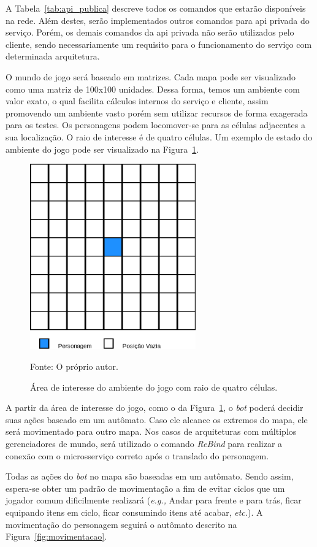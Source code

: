 A Tabela~\ref{tab:api_publica} descreve todos os comandos que estarão disponíveis na rede.
%
Além destes, serão implementados outros comandos para \ac{api} privada do serviço.
%
Porém, os demais comandos da \ac{api} privada não serão utilizados pelo cliente, sendo necessariamente um requisito para o funcionamento do serviço com determinada arquitetura.


O mundo de jogo será baseado em matrizes.
%
Cada mapa pode ser visualizado como uma matriz de 100x100 unidades.
%
Dessa forma, temos um ambiente com valor exato, o qual facilita cálculos internos do serviço e cliente, assim promovendo um ambiente vasto porém sem utilizar recursos de forma exagerada para os testes.
%
Os personagens podem locomover-se para as células adjacentes a sua localização.
%
O raio de interesse é de quatro células.
%
Um exemplo de estado do ambiente do jogo pode ser visualizado na Figura~\ref{fig:roi}.

\begin{figure}[htb!]
  \caption{Área de interesse do ambiente do jogo com raio de quatro células.}
  \label{fig:roi}
  \includegraphics[height=8.0cm]{img/cap3/roi.png}
  \centering

  Fonte: O próprio autor.
\end{figure}

A partir da área de interesse do jogo, como o da Figura~\ref{fig:roi}, o \textit{bot} poderá decidir suas ações baseado em um autômato.
%
Caso ele alcance os extremos do mapa, ele será movimentado para outro mapa.
%
Nos casos de arquiteturas com múltiplos gerenciadores de mundo, será utilizado o comando \textit{ReBind} para realizar a conexão com o microsserviço correto após o translado do personagem.



Todas as ações do \textit{bot} no mapa são baseadas em um autômato.
%
Sendo assim, espera-se obter um padrão de movimentação a fim de evitar ciclos que um jogador comum dificilmente realizará (\textit{e.g.,} Andar para frente e para trás, ficar equipando itens em ciclo, ficar consumindo itens até acabar, \textit{etc.}).
%
A movimentação do personagem seguirá o autômato descrito na Figura~\ref{fig:movimentacao}.


